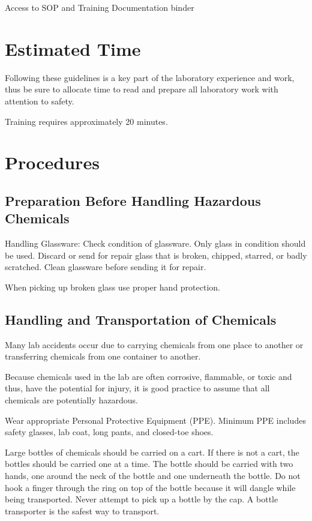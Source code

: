 \documentclass[12pt]{../SOP3}\usepackage[]{graphicx}\usepackage[]{color}
\begin{document}
\NP Access to SOP and Training Documentation binder

\section{Estimated Time}

\NP Following these guidelines is a key part of the laboratory experience and work, thus be sure to allocate time to read and prepare all laboratory work with attention to safety.

\NP Training requires approximately 20 minutes.


\section{Procedures}

\subsection*{Preparation Before Handling Hazardous Chemicals}

\NP Handling Glassware: Check condition of glassware. Only glass in condition should be used. Discard or send for repair glass that is broken, chipped, starred, or badly scratched. Clean glassware before sending it for repair. 

\NP When picking up broken glass use proper hand protection.

\subsection*{Handling and Transportation of Chemicals}

\NP Many lab accidents occur due to carrying chemicals from one place to another or transferring chemicals from one container to another. 

\NP Because chemicals used in the lab are often corrosive, flammable, or toxic and thus, have the potential for injury, it is good practice to assume that all chemicals are potentially hazardous. 

\NP Wear appropriate Personal Protective Equipment (PPE). Minimum PPE includes safety glasses, lab coat, long pants, and closed-toe shoes.

\NP Large bottles of chemicals should be carried on a cart. If there is not a cart, the bottles should be carried one at a time. The bottle should be carried with two hands, one around the neck of the bottle and one underneath the bottle. Do not hook a finger through the ring on top of the bottle because it will dangle while being transported. Never attempt to pick up a bottle by the cap. A bottle transporter is the safest way to transport. 
\end{document}
